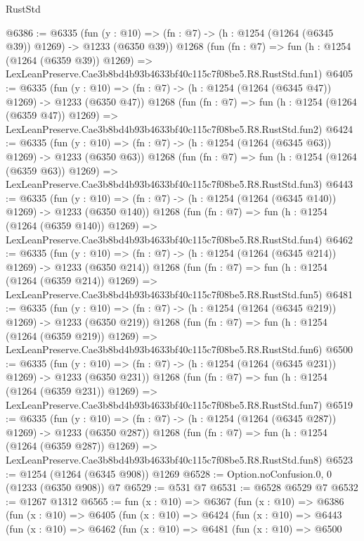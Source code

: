 \begin{lexlean}{RustStd}
\begin{coremodule}
@6386 := @6335
    (fun (y : @10) => (fn : @7) -> (h : @1254 (@1264 (@6345 @39)) @1269) -> @1233 (@6350 @39))
    @1268
    (fun (fn : @7) =>
    fun (h : @1254 (@1264 (@6359 @39)) @1269) =>
    LexLeanPreserve.Cae3b8bd4b93b4633bf40c115c7f08be5.R8.RustStd.fun1)
@6405 := @6335
    (fun (y : @10) => (fn : @7) -> (h : @1254 (@1264 (@6345 @47)) @1269) -> @1233 (@6350 @47))
    @1268
    (fun (fn : @7) =>
    fun (h : @1254 (@1264 (@6359 @47)) @1269) =>
    LexLeanPreserve.Cae3b8bd4b93b4633bf40c115c7f08be5.R8.RustStd.fun2)
@6424 := @6335
    (fun (y : @10) => (fn : @7) -> (h : @1254 (@1264 (@6345 @63)) @1269) -> @1233 (@6350 @63))
    @1268
    (fun (fn : @7) =>
    fun (h : @1254 (@1264 (@6359 @63)) @1269) =>
    LexLeanPreserve.Cae3b8bd4b93b4633bf40c115c7f08be5.R8.RustStd.fun3)
@6443 := @6335
    (fun (y : @10) => (fn : @7) -> (h : @1254 (@1264 (@6345 @140)) @1269) -> @1233 (@6350 @140))
    @1268
    (fun (fn : @7) =>
    fun (h : @1254 (@1264 (@6359 @140)) @1269) =>
    LexLeanPreserve.Cae3b8bd4b93b4633bf40c115c7f08be5.R8.RustStd.fun4)
@6462 := @6335
    (fun (y : @10) => (fn : @7) -> (h : @1254 (@1264 (@6345 @214)) @1269) -> @1233 (@6350 @214))
    @1268
    (fun (fn : @7) =>
    fun (h : @1254 (@1264 (@6359 @214)) @1269) =>
    LexLeanPreserve.Cae3b8bd4b93b4633bf40c115c7f08be5.R8.RustStd.fun5)
@6481 := @6335
    (fun (y : @10) => (fn : @7) -> (h : @1254 (@1264 (@6345 @219)) @1269) -> @1233 (@6350 @219))
    @1268
    (fun (fn : @7) =>
    fun (h : @1254 (@1264 (@6359 @219)) @1269) =>
    LexLeanPreserve.Cae3b8bd4b93b4633bf40c115c7f08be5.R8.RustStd.fun6)
@6500 := @6335
    (fun (y : @10) => (fn : @7) -> (h : @1254 (@1264 (@6345 @231)) @1269) -> @1233 (@6350 @231))
    @1268
    (fun (fn : @7) =>
    fun (h : @1254 (@1264 (@6359 @231)) @1269) =>
    LexLeanPreserve.Cae3b8bd4b93b4633bf40c115c7f08be5.R8.RustStd.fun7)
@6519 := @6335
    (fun (y : @10) => (fn : @7) -> (h : @1254 (@1264 (@6345 @287)) @1269) -> @1233 (@6350 @287))
    @1268
    (fun (fn : @7) =>
    fun (h : @1254 (@1264 (@6359 @287)) @1269) =>
    LexLeanPreserve.Cae3b8bd4b93b4633bf40c115c7f08be5.R8.RustStd.fun8)
@6523 := @1254 (@1264 (@6345 @908)) @1269
@6528 := Option.noConfusion.{0, 0} (@1233 (@6350 @908)) @7
@6529 := @531 @7
@6531 := @6528 @6529 @7
@6532 := @1267 @1312
@6565 := fun (x : @10) =>
  @6367
    (fun (x : @10) =>
    @6386
      (fun (x : @10) =>
      @6405
        (fun (x : @10) =>
        @6424
          (fun (x : @10) =>
          @6443
            (fun (x : @10) =>
            @6462
              (fun (x : @10) =>
              @6481
                (fun (x : @10) =>
                @6500

\end{coremodule}
\end{lexlean}
